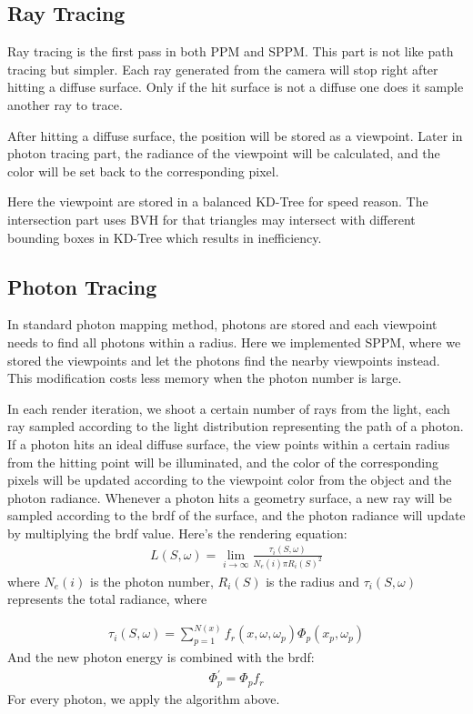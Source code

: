 \documentclass[acmtog]{acmart}
\begin{document}
		\subsection{Ray Tracing}
		Ray tracing is the first pass in both PPM and SPPM. 
		This part is not like path tracing but simpler.
		Each ray generated from the camera will stop right after hitting a diffuse surface.
		Only if the hit surface is not a diffuse one does it sample another ray to trace.

		After hitting a diffuse surface, the position will be stored as a viewpoint.
		Later in photon tracing part, the radiance of the viewpoint will be calculated,
		and the color will be set back to the corresponding pixel.

		Here the viewpoint are stored in a balanced KD-Tree for speed reason.
		The intersection part uses BVH for that triangles may intersect with different bounding boxes in KD-Tree which results in inefficiency.

	\subsection{Photon Tracing}
		In standard photon mapping method, photons are stored and each viewpoint needs to find all photons within a radius.
		Here we implemented SPPM, where we stored the viewpoints and let the photons find the nearby viewpoints instead. 
		This modification costs less memory when the photon number is large. 

		In each render iteration, we shoot a certain number of rays from the light, 
		each ray sampled according to the light distribution representing the path of a photon. 
		If a photon hits an ideal diffuse surface, the view points within a certain radius from the hitting point will be illuminated, 
		and the color of the corresponding pixels will be updated according to the viewpoint color from the object and the photon radiance. 
		Whenever a photon hits a geometry surface, a new ray will be sampled according to the brdf of the surface, 
		and the photon radiance will update by multiplying the brdf value. Here's the rendering equation:
		\begin{align}
			L(S,\omega) = \lim_{i \to \infty} \frac{\tau _i (S,\omega)}{N_e(i)\pi R_i(S)^2}
		\end{align}	where $N_e(i)$ is the photon number, $R_i(S)$ is the radius and $\tau _i (S,\omega)$ represents the total radiance, where
		
		\begin{align}
			\tau _i (S,\omega) = \sum_{p = 1}^{N(x)} f_r(x,\omega, \omega_p)\Phi_p(x_p,\omega_p)
		\end{align}
		And the new photon energy is combined with the brdf:
		\begin{align}
			\Phi_{p}^{'} = \Phi_p  f_r
		\end{align}
		For every photon, we apply the algorithm above.
\end{document}
